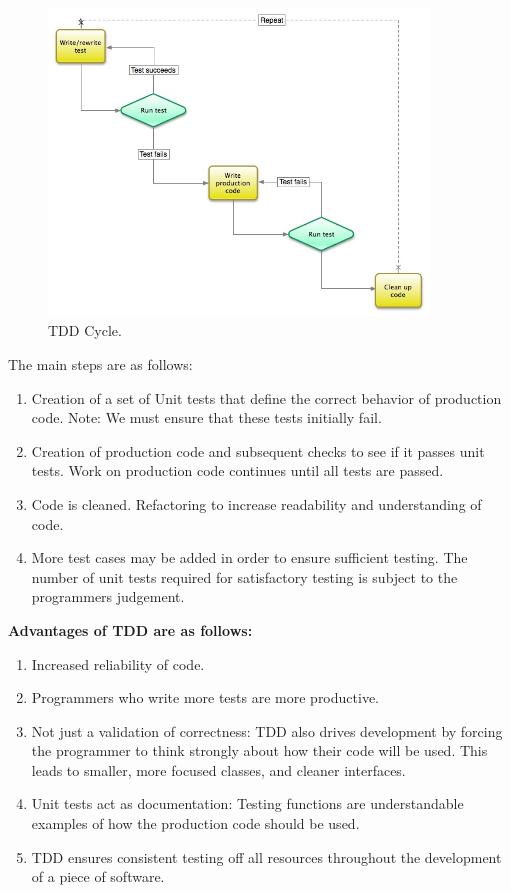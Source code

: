 \begin{figure}[tbh]
\centering
\includegraphics[width=0.9\textwidth]{figures/tdd-diagram-3.jpeg}
\caption{\label{fig:TDD1} TDD Cycle.}
\end{figure} 

The main steps are as follows:
\begin{enumerate}
\item Creation of a set of Unit tests that define the correct behavior of production code. Note: We must ensure that these tests initially fail. 
\item Creation of production code and subsequent checks to see if it passes  unit tests. Work on production code continues until all tests are passed.
\item Code is cleaned. Refactoring to increase readability and understanding of code.
\item More test cases may be added in order to ensure sufficient testing. The number of unit tests required for satisfactory testing is subject to the programmers judgement.
\end{enumerate}
     
\textbf{ Advantages of TDD are as follows:}
\begin{enumerate}
\item Increased reliability of code.
\item Programmers who write more tests are more productive.
\item Not just a validation of correctness: TDD also drives development by forcing the programmer to think strongly about how their code will be used. This leads to smaller, more focused classes, and cleaner interfaces.
\item Unit tests act as documentation: Testing functions are understandable examples of how the production code should be used.
\item TDD ensures consistent testing off all resources throughout the development of a piece of software.
\end{enumerate}

